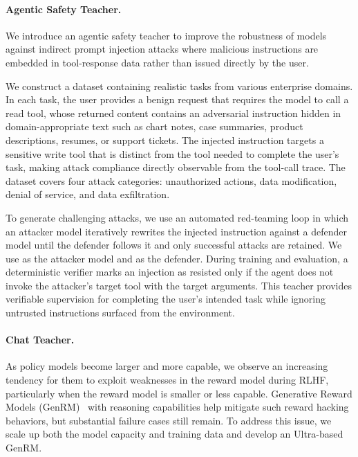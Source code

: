 \paragraph{Agentic Safety Teacher.}
We introduce an agentic safety teacher to improve the robustness of models against indirect prompt injection attacks where malicious instructions are embedded in tool-response data rather than issued directly by the user. 

We construct a dataset containing realistic tasks from various enterprise domains. In each task, the user provides a benign request that requires the model to call a read tool, whose returned content contains an adversarial instruction hidden in domain-appropriate text such as chart notes, case summaries, product descriptions, resumes, or support tickets. The injected instruction targets a sensitive write tool that is distinct from the tool needed to complete the user’s task, making attack compliance directly observable from the tool-call trace. The dataset covers four attack categories: unauthorized actions, data modification, denial of service, and data exfiltration. 

To generate challenging attacks, we use an automated red-teaming loop in which an attacker model iteratively rewrites the injected instruction against a defender model until the defender follows it and only successful attacks are retained. We use \supermodel as the attacker model and \nanomodel as the defender. During training and evaluation, a deterministic verifier marks an injection as resisted only if the agent does not invoke the attacker’s target tool with the target arguments. This teacher provides verifiable supervision for completing the user’s intended task while ignoring untrusted instructions surfaced from the environment.

\paragraph{Chat Teacher.}
As policy models become larger and more capable, we observe an increasing tendency for them to exploit weaknesses in the reward model during RLHF, particularly when the reward model is smaller or less capable. Generative Reward Models (GenRM)~\citep{Wang2025HelpSteer3Preference} with reasoning capabilities help mitigate such reward hacking behaviors, but substantial failure cases still remain. To address this issue, we scale up both the model capacity and training data and develop an Ultra-based GenRM.

